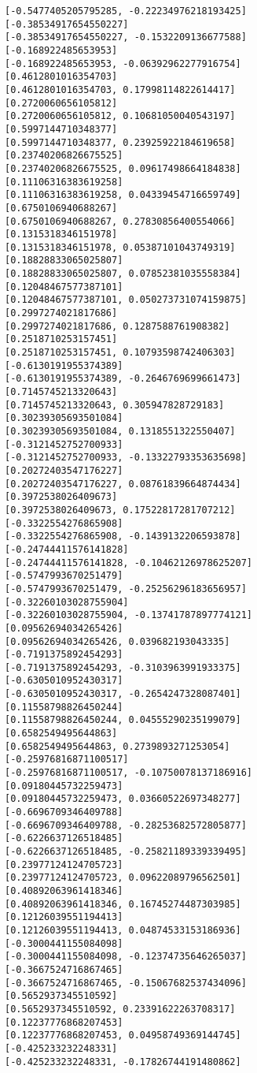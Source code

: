 \documentclass[11pt]{article}
\begin{document}
\begin{Verbatim}[commandchars=\\\{\}]
[-0.5477405205795285, -0.22234976218193425]
[-0.38534917654550227]
[-0.38534917654550227, -0.1532209136677588]
[-0.168922485653953]
[-0.168922485653953, -0.06392962277916754]
[0.4612801016354703]
[0.4612801016354703, 0.17998114822614417]
[0.2720060656105812]
[0.2720060656105812, 0.10681050040543197]
[0.5997144710348377]
[0.5997144710348377, 0.23925922184619658]
[0.23740206826675525]
[0.23740206826675525, 0.09617498664184838]
[0.11106316383619258]
[0.11106316383619258, 0.04339454716659749]
[0.6750106940688267]
[0.6750106940688267, 0.27830856400554066]
[0.1315318346151978]
[0.1315318346151978, 0.05387101043749319]
[0.18828833065025807]
[0.18828833065025807, 0.07852381035558384]
[0.12048467577387101]
[0.12048467577387101, 0.050273731074159875]
[0.2997274021817686]
[0.2997274021817686, 0.1287588761908382]
[0.2518710253157451]
[0.2518710253157451, 0.10793598742406303]
[-0.6130191955374389]
[-0.6130191955374389, -0.2646769699661473]
[0.7145745213320643]
[0.7145745213320643, 0.305947828729183]
[0.30239305693501084]
[0.30239305693501084, 0.1318551322550407]
[-0.3121452752700933]
[-0.3121452752700933, -0.13322793353635698]
[0.20272403547176227]
[0.20272403547176227, 0.08761839664874434]
[0.3972538026409673]
[0.3972538026409673, 0.17522817281707212]
[-0.3322554276865908]
[-0.3322554276865908, -0.1439132206593878]
[-0.24744411576141828]
[-0.24744411576141828, -0.10462126978625207]
[-0.5747993670251479]
[-0.5747993670251479, -0.25256296183656957]
[-0.32260103028755904]
[-0.32260103028755904, -0.13741787897774121]
[0.09562694034265426]
[0.09562694034265426, 0.039682193043335]
[-0.7191375892454293]
[-0.7191375892454293, -0.3103963991933375]
[-0.6305010952430317]
[-0.6305010952430317, -0.2654247328087401]
[0.11558798826450244]
[0.11558798826450244, 0.04555290235199079]
[0.6582549495644863]
[0.6582549495644863, 0.2739893271253054]
[-0.25976816871100517]
[-0.25976816871100517, -0.10750078137186916]
[0.09180445732259473]
[0.09180445732259473, 0.03660522697348277]
[-0.6696709346409788]
[-0.6696709346409788, -0.28253682572805877]
[-0.6226637126518485]
[-0.6226637126518485, -0.25821189339339495]
[0.23977124124705723]
[0.23977124124705723, 0.09622089796562501]
[0.40892063961418346]
[0.40892063961418346, 0.16745274487303985]
[0.12126039551194413]
[0.12126039551194413, 0.04874533153186936]
[-0.3000441155084098]
[-0.3000441155084098, -0.12374735646265037]
[-0.3667524716867465]
[-0.3667524716867465, -0.15067682537434096]
[0.5652937345510592]
[0.5652937345510592, 0.23391622263708317]
[0.12237776868207453]
[0.12237776868207453, 0.04958749369144745]
[-0.425233232248331]
[-0.425233232248331, -0.17826744191480862]

\end{Verbatim}
\end{document}
